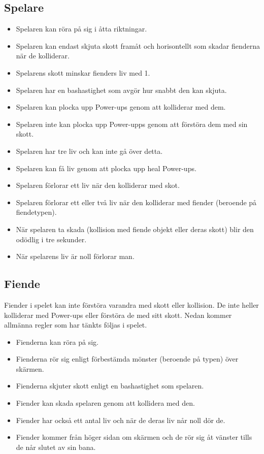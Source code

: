 \documentclass{TDP005mall}
\begin{document}
\subsection{Spelare}
\begin{itemize}
\item Spelaren kan röra på sig i åtta riktningar.
\item Spelaren kan endast skjuta skott framåt och horisontellt som skadar fienderna när de kolliderar.
\item Spelarens skott minskar fienders liv med 1.
\item Spelaren har en bashastighet som avgör hur snabbt den kan skjuta.
\item Spelaren kan plocka upp Power-ups genom att kolliderar med dem.
\item Spelaren inte kan plocka upp Power-upps genom att förstöra dem med sin skott.
\item Spelaren har tre liv och kan inte gå över detta.
\item Spelaren kan få liv genom att plocka upp heal Power-ups.
\item Spelaren förlorar ett liv när den kolliderar med skot.
\item Spelaren förlorar ett eller två liv när den kolliderar med fiender (beroende på fiendetypen).
\item När spelaren ta skada (kollision med fiende objekt eller deras skott) blir den odödlig i tre sekunder.
\item När spelarens liv är noll förlorar man.


\end{itemize}

\subsection{Fiende}
Fiender i spelet kan inte förstöra varandra med skott eller kollision. De inte heller kolliderar med Power-ups eller förstöra de med sitt skott. Nedan kommer allmänna regler som har tänkts följas i spelet.

\begin{itemize}
\item Fienderna kan röra på sig.
\item Fienderna rör sig enligt förbestämda mönster (beroende på typen) över skärmen.
\item Fienderna skjuter skott enligt en bashastighet som spelaren.
\item Fiender kan skada spelaren genom att kollidera med den.
\item Fiender har också ett antal liv och när de deras liv når noll dör de.
\item Fiender kommer från höger sidan om skärmen och de rör sig åt vänster tills de når slutet av sin bana.
\end{itemize}
\end{document}
